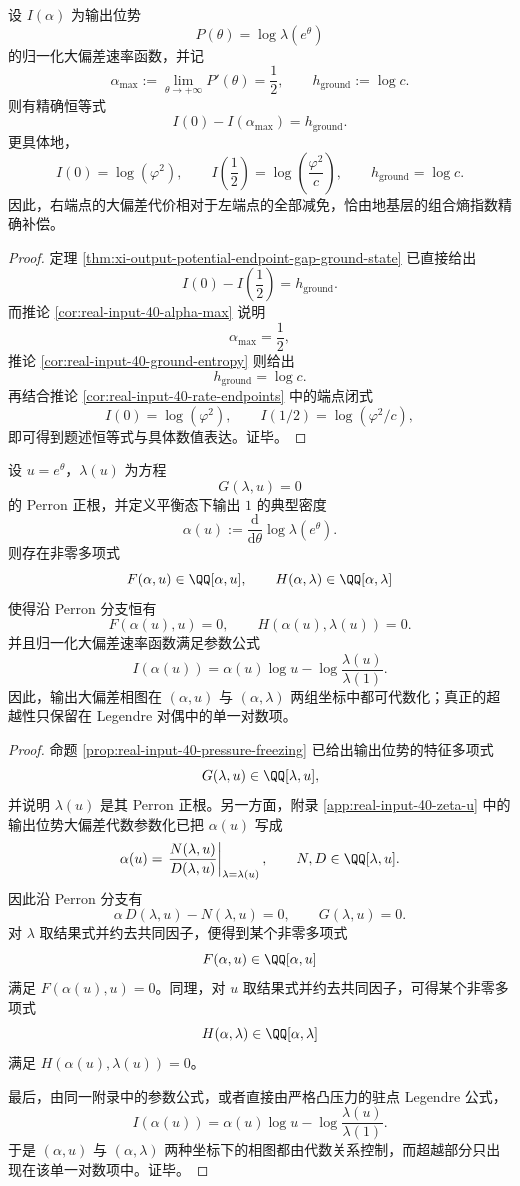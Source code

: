 \begin{proposition}[端点代价缺口恰等于地基熵]\label{prop:xi-time-part68-endpoint-gap-ground-entropy-identity}
设 \(I(\alpha)\) 为输出位势
\[
P(\theta)=\log\lambda(e^\theta)
\]
的归一化大偏差速率函数，并记
\[
\alpha_{\max}:=\lim_{\theta\to+\infty}P'(\theta)=\frac12,
\qquad
h_{\mathrm{ground}}:=\log c.
\]
则有精确恒等式
\[
I(0)-I(\alpha_{\max})=h_{\mathrm{ground}}.
\]
更具体地，
\[
I(0)=\log(\varphi^2),
\qquad
I\!\left(\frac12\right)=\log\!\left(\frac{\varphi^2}{c}\right),
\qquad
h_{\mathrm{ground}}=\log c.
\]
因此，右端点的大偏差代价相对于左端点的全部减免，恰由地基层的组合熵指数精确补偿。
\end{proposition}
\begin{proof}
定理 \ref{thm:xi-output-potential-endpoint-gap-ground-state} 已直接给出
\[
I(0)-I\!\left(\frac12\right)=h_{\mathrm{ground}}.
\]
而推论 \ref{cor:real-input-40-alpha-max} 说明
\[
\alpha_{\max}=\frac12,
\]
推论 \ref{cor:real-input-40-ground-entropy} 则给出
\[
h_{\mathrm{ground}}=\log c.
\]
再结合推论 \ref{cor:real-input-40-rate-endpoints} 中的端点闭式
\[
I(0)=\log(\varphi^2),
\qquad
I(1/2)=\log(\varphi^2/c),
\]
即可得到题述恒等式与具体数值表达。证毕。
\end{proof}

\begin{theorem}[输出大偏差相图的代数一致化]\label{thm:xi-time-part68-output-ldp-phase-diagram-algebraization}
设 \(u=e^\theta\)，\(\lambda(u)\) 为方程
\[
G(\lambda,u)=0
\]
的 Perron 正根，并定义平衡态下输出 \(1\) 的典型密度
\[
\alpha(u):=\frac{\mathrm d}{\mathrm d\theta}\log\lambda(e^\theta).
\]
则存在非零多项式
\[
F(\alpha,u)\in\QQ[\alpha,u],
\qquad
H(\alpha,\lambda)\in\QQ[\alpha,\lambda]
\]
使得沿 Perron 分支恒有
\[
F(\alpha(u),u)=0,
\qquad
H(\alpha(u),\lambda(u))=0.
\]
并且归一化大偏差速率函数满足参数公式
\[
I(\alpha(u))
=
\alpha(u)\log u-\log\frac{\lambda(u)}{\lambda(1)}.
\]
因此，输出大偏差相图在 \((\alpha,u)\) 与 \((\alpha,\lambda)\) 两组坐标中都可代数化；真正的超越性只保留在 Legendre 对偶中的单一对数项。
\end{theorem}
\begin{proof}
命题 \ref{prop:real-input-40-pressure-freezing} 已给出输出位势的特征多项式
\[
G(\lambda,u)\in\QQ[\lambda,u],
\]
并说明 \(\lambda(u)\) 是其 Perron 正根。另一方面，附录 \ref{app:real-input-40-zeta-u} 中的输出位势大偏差代数参数化已把 \(\alpha(u)\) 写成
\[
\alpha(u)=\left.\frac{N(\lambda,u)}{D(\lambda,u)}\right|_{\lambda=\lambda(u)},
\qquad
N,D\in\QQ[\lambda,u].
\]
因此沿 Perron 分支有
\[
\alpha\,D(\lambda,u)-N(\lambda,u)=0,
\qquad
G(\lambda,u)=0.
\]
对 \(\lambda\) 取结果式并约去共同因子，便得到某个非零多项式
\[
F(\alpha,u)\in\QQ[\alpha,u]
\]
满足 \(F(\alpha(u),u)=0\)。同理，对 \(u\) 取结果式并约去共同因子，可得某个非零多项式
\[
H(\alpha,\lambda)\in\QQ[\alpha,\lambda]
\]
满足 \(H(\alpha(u),\lambda(u))=0\)。

最后，由同一附录中的参数公式，或者直接由严格凸压力的驻点 Legendre 公式，
\[
I(\alpha(u))
=
\alpha(u)\log u-\log\frac{\lambda(u)}{\lambda(1)}.
\]
于是 \((\alpha,u)\) 与 \((\alpha,\lambda)\) 两种坐标下的相图都由代数关系控制，而超越部分只出现在该单一对数项中。证毕。
\end{proof}

